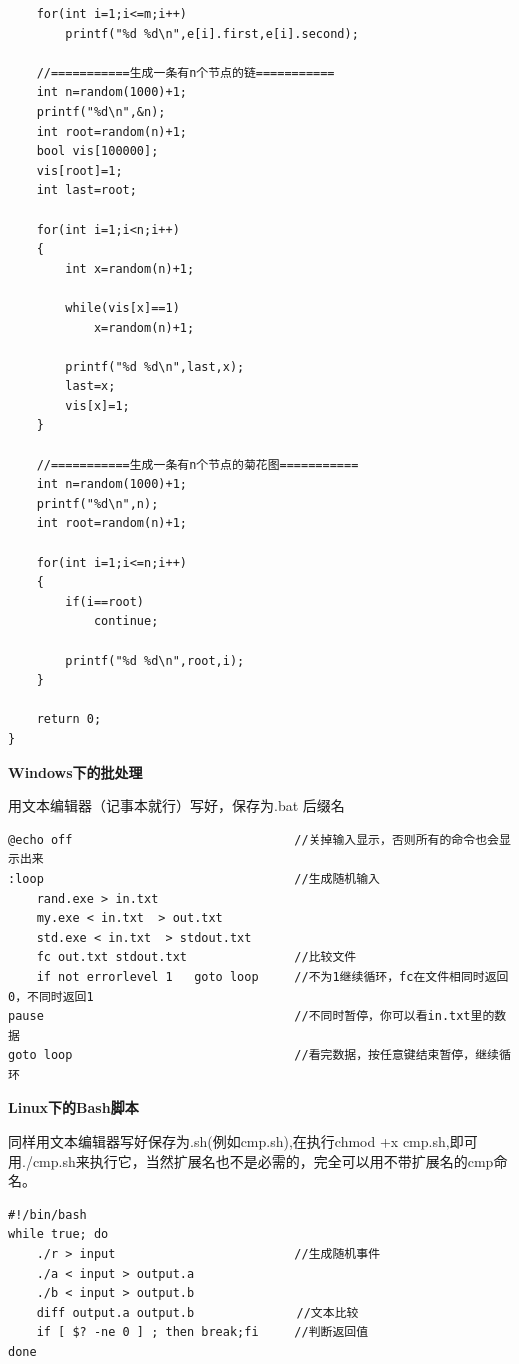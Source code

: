 \begin{verbatim}
    for(int i=1;i<=m;i++)
        printf("%d %d\n",e[i].first,e[i].second);

    //===========生成一条有n个节点的链===========
    int n=random(1000)+1;
    printf("%d\n",&n);
    int root=random(n)+1;
    bool vis[100000];
    vis[root]=1;
    int last=root;

    for(int i=1;i<n;i++)
    {
        int x=random(n)+1;

        while(vis[x]==1)
            x=random(n)+1;

        printf("%d %d\n",last,x);
        last=x;
        vis[x]=1;
    }

    //===========生成一条有n个节点的菊花图===========
    int n=random(1000)+1;
    printf("%d\n",n);
    int root=random(n)+1;

    for(int i=1;i<=n;i++)
    {
        if(i==root)
            continue;

        printf("%d %d\n",root,i);
    }

    return 0;
}
\end{verbatim}

\textbf{Windows下的批处理}

\par \noindent 用文本编辑器（记事本就行）写好，保存为.bat 后缀名
\begin{verbatim}
@echo off                               //关掉输入显示，否则所有的命令也会显示出来
:loop                                   //生成随机输入
    rand.exe > in.txt
    my.exe < in.txt  > out.txt       
    std.exe < in.txt  > stdout.txt
    fc out.txt stdout.txt               //比较文件
    if not errorlevel 1   goto loop     //不为1继续循环，fc在文件相同时返回0，不同时返回1
pause                                   //不同时暂停，你可以看in.txt里的数据
goto loop                               //看完数据，按任意键结束暂停，继续循环
\end{verbatim}

\textbf{Linux下的Bash脚本}

\par \noindent 同样用文本编辑器写好保存为.sh(例如cmp.sh),在执行chmod +x cmp.sh,即可用./cmp.sh来执行它，当然扩展名也不是必需的，完全可以用不带扩展名的cmp命名。
\begin{verbatim}
#!/bin/bash
while true; do
    ./r > input                         //生成随机事件
    ./a < input > output.a
    ./b < input > output.b
    diff output.a output.b　　　　　      //文本比较
    if [ $? -ne 0 ] ; then break;fi     //判断返回值
done
\end{verbatim}